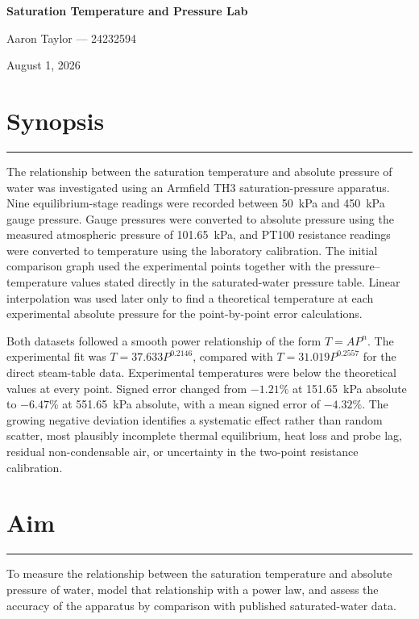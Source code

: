\documentclass[11pt,a4paper]{article}
\newcommand{\sectionrule}{\vspace{-2pt}\color{rulegray}\hrule\color{black}\vspace{5pt}}
\begin{document}
\begin{center}
  {\LARGE\bfseries Saturation Temperature and Pressure Lab}\par
  \vspace{3mm}
  {\large Aaron Taylor --- 24232594}\par
  \vspace{1.5mm}
  {\large August 1, 2026}\par
\end{center}
\vspace{4mm}

\section*{Synopsis}
\sectionrule
The relationship between the saturation temperature and absolute pressure of
water was investigated using an Armfield TH3 saturation-pressure apparatus.
Nine equilibrium-stage readings were recorded between \SI{50}{\kilo\pascal} and
\SI{450}{\kilo\pascal} gauge pressure. Gauge pressures were converted to absolute
pressure using the measured atmospheric pressure of \SI{101.65}{\kilo\pascal},
and PT100 resistance readings were converted to temperature using the
laboratory calibration. The initial comparison graph used the experimental
points together with the pressure--temperature values stated directly in the
saturated-water pressure table. Linear interpolation was used later only to
find a theoretical temperature at each experimental absolute pressure for the
point-by-point error calculations.

Both datasets followed a smooth power relationship of the form
$T=AP^n$. The experimental fit was $T=37.633P^{0.2146}$, compared with
$T=31.019P^{0.2557}$ for the direct steam-table data. Experimental temperatures were
below the theoretical values at every point. Signed error changed from
$-1.21\%$ at \SI{151.65}{\kilo\pascal} absolute to $-6.47\%$ at
\SI{551.65}{\kilo\pascal} absolute, with a mean signed error of $-4.32\%$.
The growing negative deviation identifies a systematic effect rather than
random scatter, most plausibly incomplete thermal equilibrium, heat loss and
probe lag, residual non-condensable air, or uncertainty in the two-point
resistance calibration.

\section{Aim}
\sectionrule
To measure the relationship between the saturation temperature and absolute
pressure of water, model that relationship with a power law, and assess the
accuracy of the apparatus by comparison with published saturated-water data.
\end{document}
